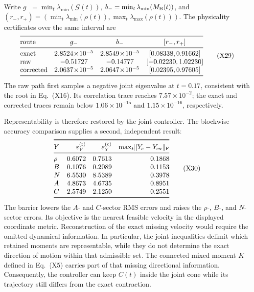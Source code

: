 \documentclass[10pt,letterpaper,twocolumn]{article}
\begin{document}
Write \(g_-=\min_t\lambda_{\min}(\mathcal G(t))\),
\(b_-=\min_t\lambda_{\min}(M_{\rm B}(t))\), and
\((r_-,r_+)=(\min_t\lambda_{\min}(\rho(t)),
\max_t\lambda_{\max}(\rho(t)))\).  The physicality certificates over the
same interval are
{\scriptsize
\[
\begin{array}{@{}lccc@{}}
\toprule
\text{route}&g_-&b_-&[r_-,r_+]\\
\midrule
\text{exact}&2.8524\!\times\!10^{-5}&2.8549\!\times\!10^{-5}
&[0.08338,0.91662]\\
\text{raw}&-0.51727&-0.14777&[-0.02230,1.02230]\\
\text{corrected}&2.0637\!\times\!10^{-5}&2.0647\!\times\!10^{-5}
&[0.02395,0.97605]\\
\bottomrule
\end{array}
\tag{X29}
\]
}
The raw path first samples a negative joint eigenvalue at \(t=0.17\),
consistent with the root in Eq.~(X16).  Its correlation trace reaches
\(7.57\times10^{-2}\); the exact and corrected traces remain below
\(1.06\times10^{-15}\) and \(1.15\times10^{-16}\), respectively.

Representability is therefore restored by the joint controller.  The
blockwise accuracy comparison supplies a second, independent result:
{\scriptsize
\[
\begin{array}{@{}lrrr@{}}
\toprule
Y&\varepsilon_Y^{(\mathrm r)}&\varepsilon_Y^{(\mathrm c)}
&\max_t\lVert Y_{\rm c}-Y_{\rm ex}\rVert_{\rm F}\\
\midrule
\rho&0.6072&0.7613&0.1868\\
B&0.1076&0.2089&0.1153\\
N&6.5530&8.5389&0.3978\\
A&4.8673&4.6735&0.8951\\
C&2.5749&2.1250&0.2551\\
\bottomrule
\end{array}
\tag{X30}
\]
}
The barrier lowers the \(A\)- and \(C\)-sector RMS errors and raises the
\(\rho\)-, \(B\)-, and \(N\)-sector errors.  Its objective is the nearest
feasible velocity in the displayed coordinate metric.  Reconstruction of the
exact missing velocity would require the omitted dynamical information.  In
particular, the joint inequalities delimit which retained moments are
representable, while they do not determine the exact direction of motion
within that admissible set.  The connected mixed moment \(K\) defined in
Eq.~(X5) carries part of that missing directional information.  Consequently,
the controller can keep \(C(t)\) inside the joint cone while its trajectory
still differs from the exact contraction.
\end{document}
